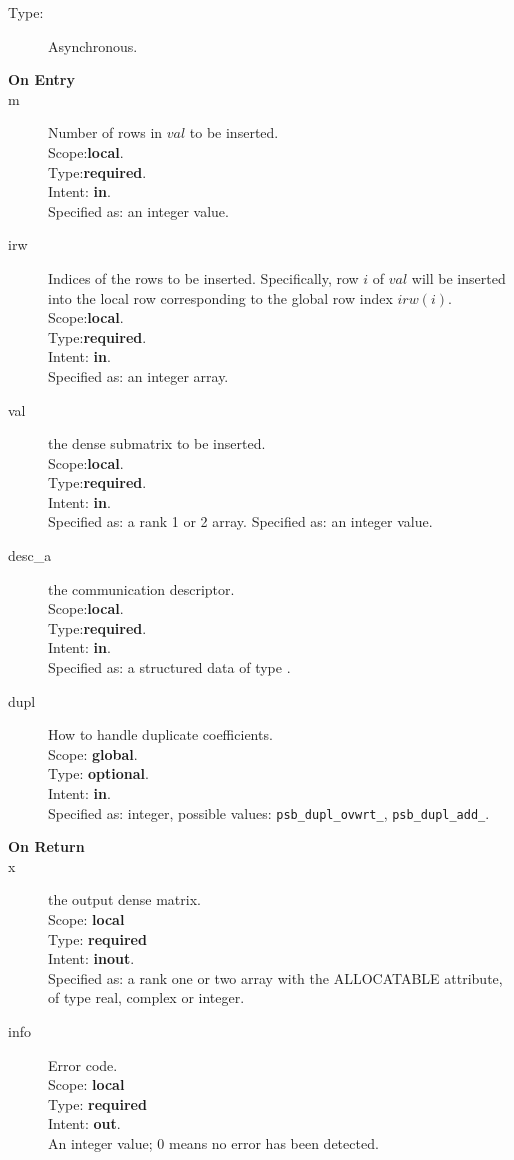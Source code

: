 \begin{description}
\item[Type:] Asynchronous.
\item[\bf On Entry]
\item[m] Number of rows in $val$  to be inserted.\\
Scope:{\bf local}.\\
Type:{\bf required}.\\
Intent: {\bf in}.\\
Specified as: an integer value.
\item[irw] Indices of the rows to be inserted. Specifically, row $i$
  of $val$ will be inserted into the local row corresponding to the
  global row index $irw(i)$.
Scope:{\bf local}.\\
Type:{\bf required}.\\
Intent: {\bf in}.\\
Specified as: an integer array.
\item[val] the dense submatrix to be inserted.\\
Scope:{\bf local}.\\
Type:{\bf required}.\\
Intent: {\bf in}.\\
Specified as: a rank 1 or 2  array.
Specified as: an integer value.
\item[desc\_a] the communication descriptor.\\
Scope:{\bf local}.\\
Type:{\bf required}.\\
Intent: {\bf in}.\\
Specified as: a structured data of type \descdata.
\item[dupl] How to handle duplicate coefficients.\\
Scope: {\bf global}.\\
Type: {\bf optional}.\\
Intent: {\bf in}.\\
Specified as: integer, possible values: \verb|psb_dupl_ovwrt_|,
\verb|psb_dupl_add_|.
\end{description}

\begin{description}
\item[\bf On Return]
\item[x] the output dense matrix.\\
Scope: {\bf local} \\
Type: {\bf required}\\
Intent: {\bf inout}.\\
Specified as: a rank one or two array with the ALLOCATABLE
attribute, of type real, complex or integer.\\
\item[info] Error code.\\
Scope: {\bf local} \\
Type: {\bf required} \\
Intent: {\bf out}.\\
An integer value; 0 means no error has been detected. 
\end{description}

